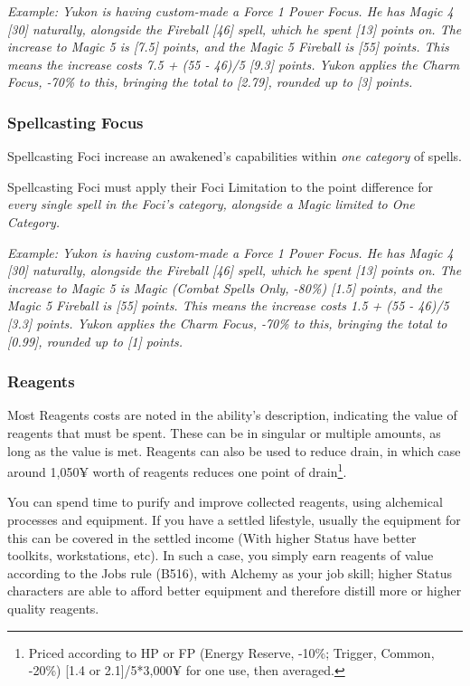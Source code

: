 \begin{multicols*}{2}
	\textcolor{OliveGreen}{\textit{Example: Yukon is having custom-made a Force 1 Power Focus. He has Magic 4 [30] naturally, alongside the Fireball [46] spell, which he spent [13] points on. The increase to Magic 5 is [7.5] points, and the Magic 5 Fireball is [55] points. This means the increase costs 7.5 + (55 - 46)/5 [9.3] points. Yukon applies the Charm Focus, -70\% to this, bringing the total to [2.79], rounded up to [3] points.}}
	
	\subsubsection{Spellcasting Focus} Spellcasting Foci increase an awakened's capabilities within \textit{one category} of spells.
	
	Spellcasting Foci must apply their Foci Limitation to the point difference for \textit{every single spell in the Foci's category, alongside a Magic limited to One Category.}
	
	\textcolor{OliveGreen}{\textit{Example: Yukon is having custom-made a Force 1 Power Focus. He has Magic 4 [30] naturally, alongside the Fireball [46] spell, which he spent [13] points on. The increase to Magic 5 is Magic (Combat Spells Only, -80\%) [1.5] points, and the Magic 5 Fireball is [55] points. This means the increase costs 1.5 + (55 - 46)/5 [3.3] points. Yukon applies the Charm Focus, -70\% to this, bringing the total to [0.99], rounded up to [1] points.}}
	
	\subsubsection{Reagents}
	
	Most Reagents costs are noted in the ability's description, indicating the value of reagents that must be spent. These can be in singular or multiple amounts, as long as the value is met. Reagents can also be used to reduce drain, in which case around 1,050¥ worth of reagents reduces one point of drain\footnote{Priced according to HP or FP (Energy Reserve, -10\%; Trigger, Common, -20\%) [1.4 or 2.1]/5*3,000¥ for one use, then averaged.}.
	
	You can spend time to purify and improve collected reagents, using alchemical processes and equipment. If you have a settled lifestyle, usually the equipment for this can be covered in the settled income (With higher Status have better toolkits, workstations, etc). In such a case, you simply earn reagents of value according to the Jobs rule (B516), with Alchemy as your job skill; higher Status characters are able to afford better equipment and therefore distill more or higher quality reagents. 
	

\end{multicols*}
